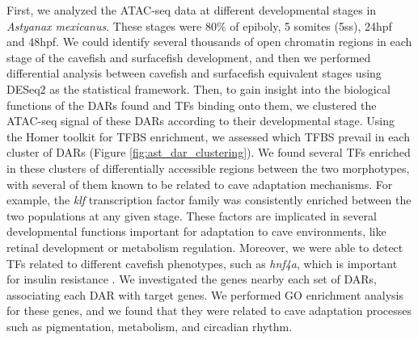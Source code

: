 First, we analyzed the ATAC-seq data at different developmental stages in \textit{Astyanax mexicanus}. These stages were 80\% of epiboly, 5 somites (5ss), 24hpf and 48hpf. We could identify several thousands of open chromatin regions in each stage of the cavefish and surfacefish development, and then we performed differential analysis between cavefish and surfacefish equivalent stages using DESeq2 \parencite{love_moderated_2014} as the statistical framework. Then, to gain insight into the biological functions of the DARs found and TFs binding onto them, we clustered the ATAC-seq signal of these DARs according to their developmental stage. Using the Homer toolkit for TFBS enrichment, we assessed which TFBS prevail in each cluster of DARs (Figure \ref{fig:ast_dar_clustering}). We found several TFs enriched in these clusters of differentially accessible regions between the two morphotypes, with several of them known to be related to cave adaptation mechanisms. For example, the \textit{klf} transcription factor family was consistently enriched between the two populations at any given stage. These factors are implicated in several developmental functions \parencite{antin_embryonic_2010} important for adaptation to cave environments, like retinal development \parencite{gautam_multi-species_2021} or metabolism regulation\parencite{li_kruppel-like_2022}. Moreover, we were able to detect TFs related to different cavefish phenotypes, such as \textit{hnf4a}, which is important for insulin resistance \parencite{warren_chromosome-level_2021, krishnan_genome-wide_2022}. We investigated the genes nearby each set of DARs, associating each DAR with target genes. We performed GO enrichment analysis for these genes, and we found that they were related to cave adaptation processes such as pigmentation, metabolism, and circadian rhythm.



